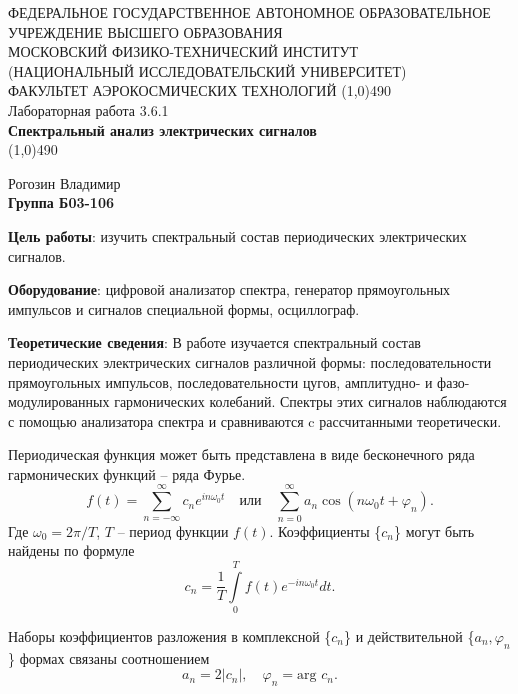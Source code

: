 \documentclass[a4paper,12pt]{article}
\begin{document}
\begin{titlepage}
\begin{center}
\large{\small ФЕДЕРАЛЬНОЕ ГОСУДАРСТВЕННОЕ АВТОНОМНОЕ ОБРАЗОВАТЕЛЬНОЕ\\ УЧРЕЖДЕНИЕ ВЫСШЕГО ОБРАЗОВАНИЯ \\ МОСКОВСКИЙ ФИЗИКО-ТЕХНИЧЕСКИЙ ИНСТИТУТ\\ (НАЦИОНАЛЬНЫЙ ИССЛЕДОВАТЕЛЬСКИЙ УНИВЕРСИТЕТ)\\ ФАКУЛЬТЕТ АЭРОКОСМИЧЕСКИХ ТЕХНОЛОГИЙ}
\vfill
\line(1,0){490}\\[1mm]
\huge{Лабораторная работа 3.6.1}\\
\huge\textbf{Спектральный анализ электрических сигналов}\\
\line(1,0){490}\\[1mm]
\vfill
\begin{flushright}
\normalsize{Рогозин Владимир}\\
\normalsize{\textbf{Группа Б03-106}}\\
\end{flushright}
\end{center}
\end{titlepage}


\textbf{Цель работы}: 
изучить спектральный состав периодических электрических сигналов.

\textbf{Оборудование}:
цифровой анализатор спектра, генератор прямоугольных импульсов и сигналов специальной формы, осциллограф.

\textbf{Теоретические сведения}: 
В работе изучается спектральный состав периодических электрических сигналов различной формы: последовательности прямоугольных импульсов, последовательности цугов, амплитудно- и фазо-модулированных гармонических колебаний. Спектры этих сигналов наблюдаются с помощью анализатора спектра и сравниваются c рассчитанными теоретически.

Периодическая функция может быть представлена в виде бесконечного ряда гармонических функций -- ряда Фурье.
\[f(t) = \sum_{n = -\infty}^\infty c_n e^{i n \omega_0 t} \quad \text{или} \quad \sum_{n = 0}^\infty a_n \cos(n \omega_0 t + \varphi_n).\]
Где $\omega_0 = 2 \pi / T$, $T$ -- период функции $f(t)$. Коэффициенты \{$c_n$\} могут быть найдены по формуле 
\[c_n = \frac{1}{T} \int\limits_0^T f(t) e^{- i n \omega_0 t} dt.\]

Наборы коэффициентов разложения в комплексной \{$c_n$\} и действительной \{$a_n, \varphi_n$\} формах связаны соотношением 
\[a_n = 2 |c_n|, \quad \varphi_n = \text{arg }c_n.\]
\end{document}
